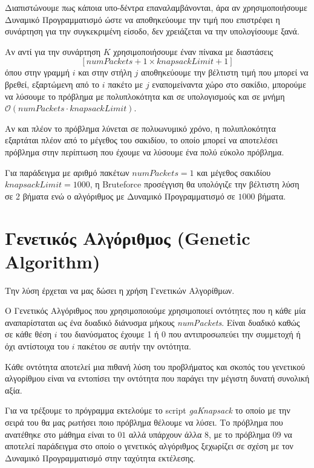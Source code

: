 \documentclass{article}
\begin{document}
Διαπιστώνουμε πως κάποια υπο-δέντρα επαναλαμβάνονται, άρα αν χρησιμοποιήσουμε
Δυναμικό Προγραμματισμό ώστε να αποθηκεύουμε την τιμή που επιστρέφει η συνάρτηση
για την συγκεκριμένη είσοδο, δεν χρειάζεται να την υπολογίσουμε ξανά.

Αν αντί για την συνάρτηση $K$ χρησιμοποιήσουμε έναν πίνακα με διαστάσεις
\begin{equation*}
\left[\textit{numPackets}+1 \times \textit{knapsackLimit}+1\right]
\end{equation*}
όπου στην γραμμή $i$ και στην στήλη $j$ αποθηκεύουμε την βέλτιστη τιμή που
μπορεί να βρεθεί, εξαρτώμενη από το $i$ πακέτο με $j$ εναπομείναντα χώρο στο
σακίδιο, μπορούμε να λύσουμε το πρόβλημα με πολυπλοκότητα και σε υπολογισμούς
και σε μνήμη $\mathcal{O}\left(\textit{numPackets} \cdot
\textit{knapsackLimit}\right)$.

Αν και πλέον το πρόβλημα λύνεται σε πολυωνυμικό χρόνο, η πολυπλοκότητα εξαρτάται
πλέον από το μέγεθος του σακιδίου, το οποίο μπορεί να αποτελέσει πρόβλημα στην
περίπτωση που έχουμε να λύσουμε ένα πολύ εύκολο πρόβλημα.

Για παράδειγμα με αριθμό πακέτων $\textit{numPackets} = 1$ και μέγεθος σακιδίου
$\textit{knapsackLimit} = 1000$, η Bruteforce προσέγγιση θα υπολόγιζε την
βέλτιστη λύση σε 2 βήματα ενώ ο αλγόριθμος με Δυναμικό Προγραμματισμό σε $1000$
βήματα.

\section{Γενετικός Αλγόριθμος (Genetic Algorithm)}

Την λύση έρχεται να μας δώσει η χρήση Γενετικών Αλγορίθμων.

Ο Γενετικός Αλγόριθμος που χρησιμοποιούμε χρησιμοποιεί οντότητες που η κάθε μία
αναπαρίσταται ως ένα δυαδικό διάνυσμα μήκους \textit{numPackets}. Είναι δυαδικό
καθώς σε κάθε θέση $i$ του διανύσματος έχουμε 1 ή 0 που αντιπροσωπεύει την
συμμετοχή ή όχι αντίστοιχα του $i$ πακέτου σε αυτήν την οντότητα.

Κάθε οντότητα αποτελεί μια πιθανή λύση του προβλήματος και σκοπός του γενετικού
αλγορίθμου είναι να εντοπίσει την οντότητα που παράγει την μέγιστη δυνατή
συνολική αξία.

Για να τρέξουμε το πρόγραμμα εκτελούμε το script \textit{gaKnapsack} το οποίο με
την σειρά του θα μας ρωτήσει ποιο πρόβλημα θέλουμε να λύσει. Το πρόβλημα που
ανατέθηκε στο μάθημα είναι το $01$ αλλά υπάρχουν άλλα $8$, με το πρόβλημα $09$
να αποτελεί παράδειγμα στο οποίο ο γενετικός αλγόριθμος ξεχωρίζει σε σχέση με
τον Δυναμικό Προγραμματισμό στην ταχύτητα εκτέλεσης.
\end{document}
